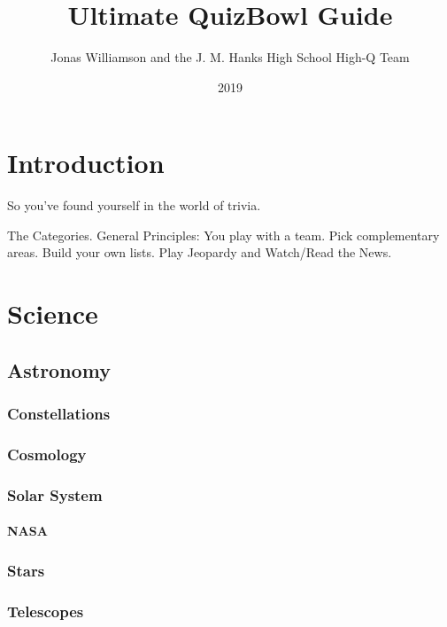 \documentclass[12pt]{book}
\begin{document}
	\frontmatter
	\title{Ultimate QuizBowl Guide}
	\author{Jonas Williamson and the  J. M. Hanks High School High-Q Team}
	\date{2019}
	\maketitle
	\begin{center}
			\huge \cc \byncsa
	\end{center}

	\normalsize
	\tableofcontents

	\mainmatter
	
	
\chapter{Introduction}
So you've found yourself in the world of trivia.  

The Categories.
General Principles: You play with a team.  Pick complementary areas.  Build your own lists.  Play Jeopardy and Watch/Read the News.




\chapter{Science}
	\section{Astronomy}
		\subsection{Constellations}
		\subsection{Cosmology}
		\subsection{Solar System}
			\subsubsection{NASA}
		\subsection{Stars}
		\subsection{Telescopes}
\end{document}
